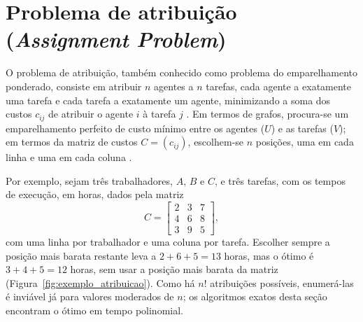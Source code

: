\section{Problema de atribuição (\textit{Assignment Problem})}
\label{sec:assignment_problem}

O problema de atribuição, também conhecido como problema do emparelhamento ponderado, consiste em atribuir $n$ agentes a $n$ tarefas, cada agente a exatamente uma tarefa e cada tarefa a exatamente um agente, minimizando a soma dos custos $c_{ij}$ de atribuir o agente $i$ à tarefa $j$ \cite{lawler}. Em termos de grafos, procura-se um emparelhamento perfeito de custo mínimo entre os agentes ($U$) e as tarefas ($V$); em termos da matriz de custos $C = (c_{ij})$, escolhem-se $n$ posições, uma em cada linha e uma em cada coluna \cite{burkard}.

Por exemplo, sejam três trabalhadores, $A$, $B$ e $C$, e três tarefas, com os tempos de execução, em horas, dados pela matriz
\begin{equation}
    C = \begin{bmatrix} 2 & 3 & 7 \\ 4 & 6 & 8 \\ 3 & 9 & 5 \end{bmatrix},
    \label{eq:exemplo_atribuicao}
\end{equation}
com uma linha por trabalhador e uma coluna por tarefa. Escolher sempre a posição mais barata restante leva a $2 + 6 + 5 = 13$ horas, mas o ótimo é $3 + 4 + 5 = 12$ horas, sem usar a posição mais barata da matriz (Figura~\ref{fig:exemplo_atribuicao}). Como há $n!$ atribuições possíveis, enumerá-las é inviável já para valores moderados de $n$; os algoritmos exatos desta seção encontram o ótimo em tempo polinomial.

